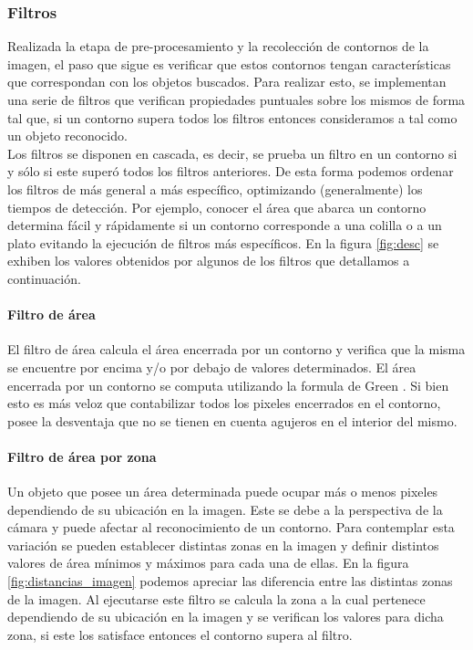 	

	\subsubsection{\label{sec:filtros} Filtros}
	Realizada la etapa de pre-procesamiento y la recolecci\'on de contornos 
	de la imagen, el paso que sigue es verificar que estos
	contornos tengan caracter\'isticas que correspondan con  los 
	objetos buscados. Para realizar esto, se implementan una serie de filtros que verifican propiedades
	puntuales sobre los mismos de forma tal que, si un contorno supera todos los filtros entonces consideramos a tal como un objeto reconocido. \\
	\indent Los filtros se disponen en cascada, es decir, se prueba un 
	filtro en un contorno si y s\'olo si este super\'o todos los filtros 
	anteriores. De esta forma podemos ordenar los filtros de m\'as general 
	a m\'as espec\'ifico, optimizando (generalmente) los tiempos de detecci\'on. Por ejemplo, conocer 
	el \'area que abarca un contorno determina f\'acil y r\'apidamente si un contorno corresponde a una colilla o a un plato evitando la ejecuci\'on
	de filtros m\'as espec\'ificos. En la figura \ref{fig:desc} se exhiben 
	los valores obtenidos por algunos de los filtros que detallamos a 
	continuaci\'on.
	\paragraph{Filtro de \'area}
	El filtro de \'area calcula el \'area encerrada por un contorno y verifica que la misma se encuentre por encima y/o por debajo
	de valores determinados. El \'area encerrada por un contorno se computa utilizando la formula de Green \cite{greenwolfram}.
	Si bien esto es m\'as veloz que contabilizar todos los pixeles encerrados en el contorno, posee la desventaja que no se tienen en cuenta agujeros
	en el interior del mismo.
	\paragraph{Filtro de \'area por zona}
	Un objeto que posee un \'area determinada puede ocupar m\'as o menos pixeles dependiendo de su ubicaci\'on en la imagen. Este se debe a la 
	perspectiva de la c\'amara y puede afectar al reconocimiento de un contorno. Para contemplar esta variaci\'on se pueden establecer distintas
	zonas en la imagen y definir distintos valores de \'area m\'inimos y m\'aximos para cada una de ellas. En la figura 
	\ref{fig:distancias_imagen} podemos apreciar las diferencia entre las distintas zonas de la imagen. 
	Al ejecutarse este filtro se calcula la
	zona a la cual pertenece dependiendo de su ubicaci\'on en la imagen y se verifican los valores para dicha zona, si este los satisface entonces
	el contorno supera al filtro.
